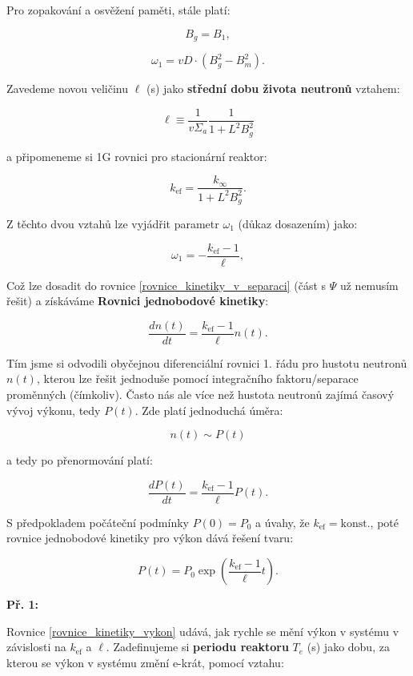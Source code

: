 Pro zopakování a osvěžení paměti, stále platí:

$$ B_g = B_1, $$

$$ \omega_1 = vD \cdot (B_g^2 - B_m^2). $$

Zavedeme novou veličinu $\ell$ (s) jako \textbf{střední dobu života neutronů} vztahem:

\begin{equation}
  \boxed{
  \ell \equiv \dfrac{1}{v \Sigma_a} \dfrac{1}{1+L^2B_g^2}
  \label{stredni_doba_zivota}}
\end{equation}

a připomeneme si 1G rovnici pro stacionární reaktor:

$$ k_{\text{ef}} = \dfrac{k_{\infty}}{1 + L^2 B_g^2}. $$

Z těchto dvou vztahů lze vyjádřit parametr $\omega_1$ (důkaz dosazením) jako:

$$ \omega_1 = -\dfrac{k_{\text{ef}} - 1}{\ell}, $$

Což lze dosadit do rovnice \eqref{rovnice_kinetiky_v_separaci} (část s $\Psi$ už nemusím řešit) a získáváme \textbf{Rovnici jednobodové kinetiky}:

\begin{equation}
  \boxed{
  \dfrac{dn(t)}{dt} = \dfrac{k_{\text{ef}} - 1}{\ell} n(t).
  \label{rovnice_kinetiky_reseni}}
\end{equation}

Tím jsme si odvodili obyčejnou diferenciální rovnici 1. řádu pro hustotu neutronů $n(t)$, kterou lze řešit jednoduše pomocí integračního faktoru/separace proměnných (čímkoliv). Často nás ale více než hustota neutronů zajímá časový vývoj výkonu, tedy $P(t)$. Zde platí jednoduchá úměra:

$$ n(t) \sim P(t) $$

a tedy po přenormování platí:

$$ \dfrac{dP(t)}{dt} = \dfrac{k_{\text{ef}} - 1}{\ell} P(t). $$

S předpokladem počáteční podmínky $P(0) = P_0$ a úvahy, že $k_{\text{ef}} = \text{konst.}$, poté rovnice jednobodové kinetiky pro výkon dává řešení tvaru:

\begin{equation}
  P(t) = P_0 \exp \left ( \dfrac{k_{\text{ef}} - 1}{\ell} t \right ).
  \label{rovnice_kinetiky_vykon}
\end{equation}

\small

\textbf{Př. 1:}

Rovnice \eqref{rovnice_kinetiky_vykon} udává, jak rychle se mění výkon v systému v závislosti na $k_{\text{ef}}$ a $\ell$. Zadefinujeme si \textbf{periodu reaktoru} $T_e$ (s) jako dobu, za kterou se výkon v systému změní e-krát, pomocí vztahu:


